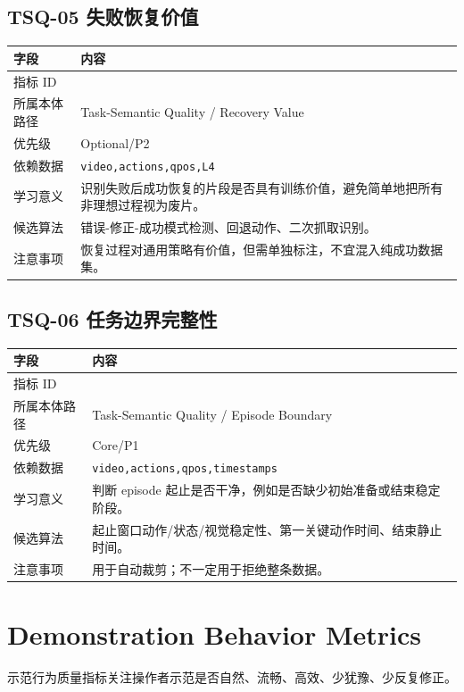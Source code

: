 \documentclass[UTF8,zihao=-4,oneside,openany]{ctexrep}
\newcommand{\Code}[1]{\texttt{#1}}
\newcommand{\MID}[1]{\texttt{\seqsplit{#1}}}
\begin{document}
\subsection{TSQ-05 失败恢复价值}

\begin{longtable}{L{3.6cm} L{9.6cm}}
\toprule
字段 & 内容 \\
\midrule
指标 ID & \MID{TSQ-05} \\
所属本体路径 & Task-Semantic Quality / Recovery Value \\
优先级 & Optional/P2 \\
依赖数据 & \Code{video,actions,qpos,L4} \\
学习意义 & 识别失败后成功恢复的片段是否具有训练价值，避免简单地把所有非理想过程视为废片。 \\
候选算法 & 错误-修正-成功模式检测、回退动作、二次抓取识别。 \\
注意事项 & 恢复过程对通用策略有价值，但需单独标注，不宜混入纯成功数据集。 \\
\bottomrule
\end{longtable}

\subsection{TSQ-06 任务边界完整性}

\begin{longtable}{L{3.6cm} L{9.6cm}}
\toprule
字段 & 内容 \\
\midrule
指标 ID & \MID{TSQ-06} \\
所属本体路径 & Task-Semantic Quality / Episode Boundary \\
优先级 & Core/P1 \\
依赖数据 & \Code{video,actions,qpos,timestamps} \\
学习意义 & 判断 episode 起止是否干净，例如是否缺少初始准备或结束稳定阶段。 \\
候选算法 & 起止窗口动作/状态/视觉稳定性、第一关键动作时间、结束静止时间。 \\
注意事项 & 用于自动裁剪；不一定用于拒绝整条数据。 \\
\bottomrule
\end{longtable}

\section{Demonstration Behavior Metrics}

示范行为质量指标关注操作者示范是否自然、流畅、高效、少犹豫、少反复修正。
\end{document}
